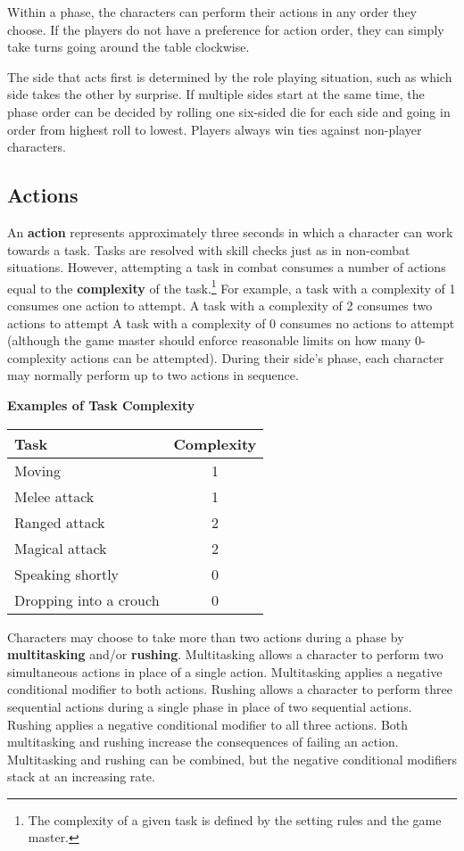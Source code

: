 \documentclass[11pt]{article}
\begin{document}
Within a phase, the characters can perform their actions in any order they choose.
If the players do not have a preference for action order, they can simply take turns going around the table clockwise.

The side that acts first is determined by the role playing situation, such as which side takes the other by surprise.
If multiple sides start at the same time, the phase order can be decided by rolling one six-sided die for each side and going in order from highest roll to lowest.
Players always win ties against non-player characters.

\subsection{Actions}
An \textbf{action} represents approximately three seconds in which a character can work towards a task.
Tasks are resolved with skill checks just as in non-combat situations.
However, attempting a task in combat consumes a number of actions equal to the \textbf{complexity} of the task.\footnote{The complexity of a given task is defined by the setting rules and the game master.}
For example, a task with a complexity of 1 consumes one action to attempt.
A task with a complexity of 2 consumes two actions to attempt
A task with a complexity of 0 consumes no actions to attempt (although the game master should enforce reasonable limits on how many 0-complexity actions can be attempted).
During their side's phase, each character may normally perform up to two actions in sequence.

\begin{center}
	\textbf{Examples of Task Complexity} \\
	\begin{tabular}{lc}
		Task                   & Complexity \\
		\hline
		Moving                 & 1          \\
		Melee attack           & 1          \\
		Ranged attack          & 2          \\
		Magical attack         & 2          \\
		Speaking shortly       & 0          \\
		Dropping into a crouch & 0          \\
	\end{tabular}
\end{center}

Characters may choose to take more than two actions during a phase by \textbf{multitasking} and/or \textbf{rushing}.
Multitasking allows a character to perform two simultaneous actions in place of a single action.
Multitasking applies a negative conditional modifier to both actions.
Rushing allows a character to perform three sequential actions during a single phase in place of two sequential actions. Rushing applies a negative conditional modifier to all three actions.
Both multitasking and rushing increase the consequences of failing an action.
Multitasking and rushing can be combined, but the negative conditional modifiers stack at an increasing rate.
\end{document}
